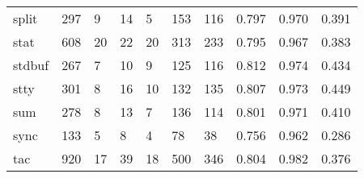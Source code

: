 \begin{longtable}{lp{1.3cm}p{1.3cm}p{1.3cm}p{1.3cm}p{1.3cm}p{1.3cm}p{1.3cm}p{1.3cm}p{1.3cm}}
split     &                    297 &                                  9 &                                14 &                                5 &                               153 &                             116 &                                   0.797 &                                  0.970 &                                0.391 \\
stat      &                    608 &                                 20 &                                22 &                               20 &                               313 &                             233 &                                   0.795 &                                  0.967 &                                0.383 \\
stdbuf    &                    267 &                                  7 &                                10 &                                9 &                               125 &                             116 &                                   0.812 &                                  0.974 &                                0.434 \\
stty      &                    301 &                                  8 &                                16 &                               10 &                               132 &                             135 &                                   0.807 &                                  0.973 &                                0.449 \\
sum       &                    278 &                                  8 &                                13 &                                7 &                               136 &                             114 &                                   0.801 &                                  0.971 &                                0.410 \\
sync      &                    133 &                                  5 &                                 8 &                                4 &                                78 &                              38 &                                   0.756 &                                  0.962 &                                0.286 \\
tac       &                    920 &                                 17 &                                39 &                               18 &                               500 &                             346 &                                   0.804 &                                  0.982 &                                0.376 \\

\end{longtable}
